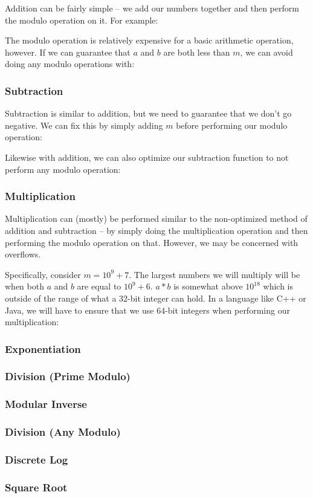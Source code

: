 Addition can be fairly simple -- we add our numbers together and then perform the modulo operation on it. For example:


The modulo operation is relatively expensive for a basic arithmetic operation, however. If we can guarantee that $a$ and $b$ are both less than $m$, we can avoid doing any modulo operations with:


\subsubsection{Subtraction}

Subtraction is similar to addition, but we need to guarantee that we don't go negative. We can fix this by simply adding $m$ before performing our modulo operation:


Likewise with addition, we can also optimize our subtraction function to not perform any modulo operation:


\subsubsection{Multiplication}

Multiplication can (mostly) be performed similar to the non-optimized method of addition and subtraction -- by simply doing the multiplication operation and then performing the modulo operation on that. However, we may be concerned with overflows.

Specifically, consider $m = 10^9 + 7$. The largest numbers we will multiply will be when both $a$ and $b$ are equal to $10^9 + 6$. $a * b$ is somewhat above $10^{18}$ which is outside of the range of what a 32-bit integer can hold. In a language like C++ or Java, we will have to ensure that we use 64-bit integers when performing our multiplication:


\subsubsection{Exponentiation}

\subsubsection{Division (Prime Modulo)}

\subsubsection{Modular Inverse}

\subsubsection{Division (Any Modulo)}

\subsubsection{Discrete Log}

\subsubsection{Square Root}
